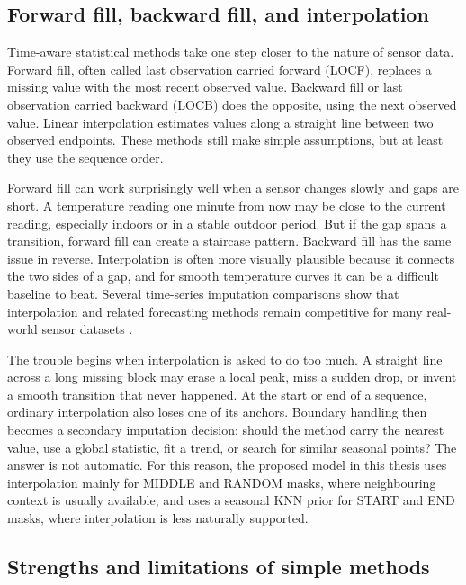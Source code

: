 \subsection{Forward fill, backward fill, and interpolation}

Time-aware statistical methods take one step closer to the nature of sensor data. Forward fill, often called last observation carried forward (LOCF), replaces a missing value with the most recent observed value. Backward fill or last observation carried backward (LOCB) does the opposite, using the next observed value. Linear interpolation estimates values along a straight line between two observed endpoints. These methods still make simple assumptions, but at least they use the sequence order.

Forward fill can work surprisingly well when a sensor changes slowly and gaps are short. A temperature reading one minute from now may be close to the current reading, especially indoors or in a stable outdoor period. But if the gap spans a transition, forward fill can create a staircase pattern. Backward fill has the same issue in reverse. Interpolation is often more visually plausible because it connects the two sides of a gap, and for smooth temperature curves it can be a difficult baseline to beat. Several time-series imputation comparisons show that interpolation and related forecasting methods remain competitive for many real-world sensor datasets \cite{Ahn2022ComparisonOM,RoseroMontalvo2023TimeSeriesFT,Toye2025BenchmarkingMD}.

The trouble begins when interpolation is asked to do too much. A straight line across a long missing block may erase a local peak, miss a sudden drop, or invent a smooth transition that never happened. At the start or end of a sequence, ordinary interpolation also loses one of its anchors. Boundary handling then becomes a secondary imputation decision: should the method carry the nearest value, use a global statistic, fit a trend, or search for similar seasonal points? The answer is not automatic. For this reason, the proposed model in this thesis uses interpolation mainly for MIDDLE and RANDOM masks, where neighbouring context is usually available, and uses a seasonal KNN prior for START and END masks, where interpolation is less naturally supported.

\subsection{Strengths and limitations of simple methods}

